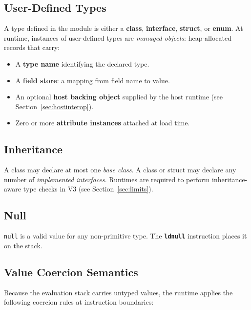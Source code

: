 \documentclass[11pt,a4paper]{article}
\newcommand{\opcode}[1]{\textbf{\texttt{#1}}}
\begin{document}
\subsection{User-Defined Types}

A type defined in the module is either a \textbf{class}, \textbf{interface},
\textbf{struct}, or \textbf{enum}. At runtime, instances of user-defined
types are \emph{managed objects}: heap-allocated records that carry:

\begin{itemize}[leftmargin=1.8em]
  \item A \textbf{type name} identifying the declared type.
  \item A \textbf{field store}: a mapping from field name to value.
  \item An optional \textbf{host backing object} supplied by the host runtime
    (see Section~\ref{sec:hostinterop}).
  \item Zero or more \textbf{attribute instances} attached at load time.
\end{itemize}

\subsection{Inheritance}

A class may declare at most one \emph{base class}. A class or struct may
declare any number of \emph{implemented interfaces}. Runtimes are 
required to perform inheritance-aware type checks in V3
(see Section~\ref{sec:limits}).

\subsection{Null}

\texttt{null} is a valid value for any non-primitive type. The
\opcode{ldnull} instruction places it on the stack.

\subsection{Value Coercion Semantics}
\label{sec:coerce}

Because the evaluation stack carries untyped values, the runtime applies
the following coercion rules at instruction boundaries:
\end{document}

